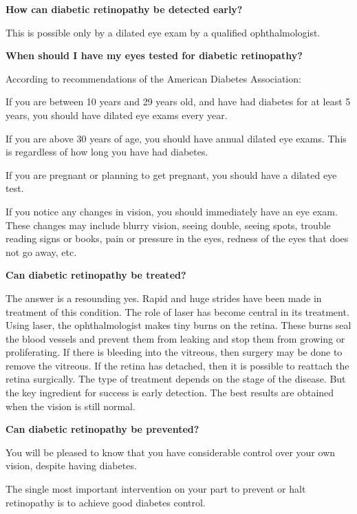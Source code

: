 \textbf{How can diabetic retinopathy be detected early?}

This is possible only by a dilated eye exam by a qualified ophthalmologist.

\textbf{When should I have my eyes tested for diabetic retinopathy?}

According to recommendations of the American Diabetes Association:

\item If you are between 10 years and 29 years old, and have had diabetes for at least 5 years, you should have dilated eye exams every year.

 \item If you are above 30 years of age, you should have annual dilated eye exams. This is regardless of how long you have had diabetes.

 \item If you are pregnant or planning to get pregnant, you should have a dilated eye test.

 \item If you notice any changes in vision, you should immediately have an eye exam. These changes may include blurry vision, seeing double, seeing spots, trouble reading signs or books, pain or pressure in the eyes, redness of the eyes that does not go away, etc.

\textbf{Can diabetic retinopathy be treated?}

The answer is a resounding yes. Rapid and huge strides have been made in treatment of this condition. The role of laser has become central in its treatment. Using laser, the ophthalmologist makes tiny burns on the retina. These burns seal the blood vessels and prevent them from leaking and stop them from growing or proliferating. If there is bleeding into the vitreous, then surgery may be done to remove the vitreous. If the retina has detached, then it is possible to reattach the retina surgically. The type of treatment depends on the stage of the disease. But the key ingredient for success is early detection. The best results are obtained when the vision is still normal.

\textbf{Can diabetic retinopathy be prevented?}

You will be pleased to know that you have considerable control over your own vision, despite having diabetes.

\item The single most important intervention on your part to prevent or halt retinopathy is to achieve good diabetes control.

